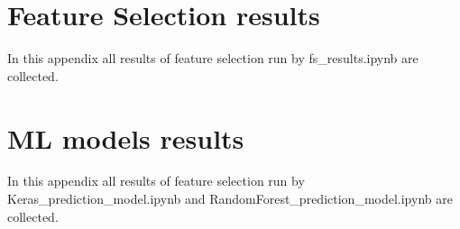 \chapter{Feature Selection results}
In this appendix all results of feature selection run by fs\_results.ipynb are collected.

\chapter{ML models results}
In this appendix all results of feature selection run by Keras\_prediction\_model.ipynb and RandomForest\_prediction\_model.ipynb are collected.